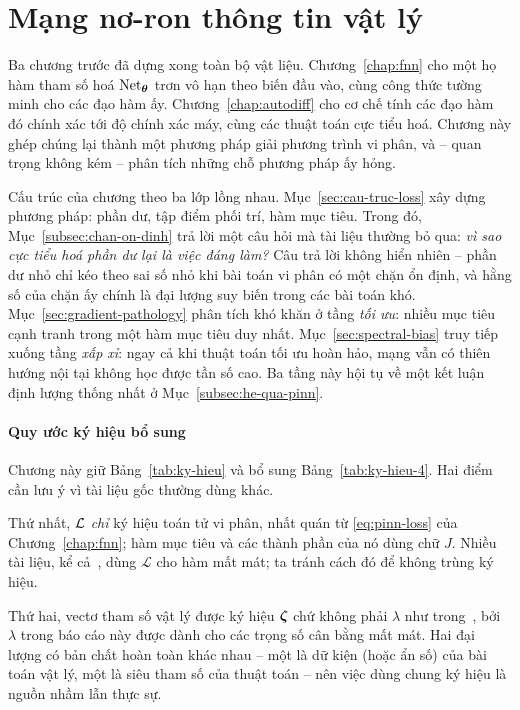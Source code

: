 \chapter{Mạng nơ-ron thông tin vật lý}
\label{chap:pinn}
 
Ba chương trước đã dựng xong toàn bộ vật liệu. Chương~\ref{chap:fnn} cho một họ
hàm tham số hoá $\operatorname{Net}_{\bm{\theta}}$ trơn vô hạn theo biến đầu vào, cùng công thức
tường minh cho các đạo hàm ấy. Chương~\ref{chap:autodiff} cho cơ chế tính các đạo
hàm đó chính xác tới độ chính xác máy, cùng các thuật toán cực tiểu hoá. Chương
này ghép chúng lại thành một phương pháp giải phương trình vi phân, và -- quan
trọng không kém -- phân tích những chỗ phương pháp ấy hỏng.
 
Cấu trúc của chương theo ba lớp lồng nhau. Mục~\ref{sec:cau-truc-loss} xây dựng
phương pháp: phần dư, tập điểm phối trí, hàm mục tiêu. Trong đó,
Mục~\ref{subsec:chan-on-dinh} trả lời một câu hỏi mà tài liệu thường bỏ qua:
\emph{vì sao cực tiểu hoá phần dư lại là việc đáng làm?} Câu trả lời không hiển
nhiên -- phần dư nhỏ chỉ kéo theo sai số nhỏ khi bài toán vi phân có một chặn ổn
định, và hằng số của chặn ấy chính là đại lượng suy biến trong các bài toán khó.
Mục~\ref{sec:gradient-pathology} phân tích khó khăn ở tầng \emph{tối ưu}: nhiều
mục tiêu cạnh tranh trong một hàm mục tiêu duy nhất.
Mục~\ref{sec:spectral-bias} truy tiếp xuống tầng \emph{xấp xỉ}: ngay cả khi thuật
toán tối ưu hoàn hảo, mạng vẫn có thiên hướng nội tại không học được tần số cao.
Ba tầng này hội tụ về một kết luận định lượng thống nhất ở
Mục~\ref{subsec:he-qua-pinn}.
 
\subsubsection*{Quy ước ký hiệu bổ sung}
 
Chương này giữ Bảng~\ref{tab:ky-hieu} và bổ sung Bảng~\ref{tab:ky-hieu-4}. Hai
điểm cần lưu ý vì tài liệu gốc thường dùng khác.
 
Thứ nhất, $\mathcal{L}$ \emph{chỉ} ký hiệu toán tử vi phân, nhất quán từ
\eqref{eq:pinn-loss} của Chương~\ref{chap:fnn}; hàm mục tiêu và các thành phần
của nó dùng chữ $J$. Nhiều tài liệu, kể cả~\cite{wang2021}, dùng $\mathcal{L}$
cho hàm mất mát; ta tránh cách đó để không trùng ký hiệu.
 
Thứ hai, vectơ tham số vật lý được ký hiệu $\bm{\zeta}$ chứ không phải $\lambda$ như
trong~\cite{raissi2019}, bởi $\lambda$ trong báo cáo này được dành cho các trọng
số cân bằng mất mát. Hai đại lượng có bản chất hoàn toàn khác nhau -- một là dữ
kiện (hoặc ẩn số) của bài toán vật lý, một là siêu tham số của thuật toán -- nên
việc dùng chung ký hiệu là nguồn nhầm lẫn thực sự.
 
